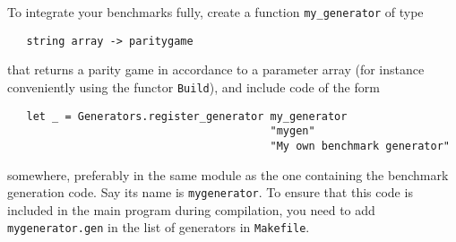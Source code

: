 To integrate your benchmarks fully, create a function \verb#my_generator# of type 
\begin{verbatim}
   string array -> paritygame
\end{verbatim}
that returns a parity game in accordance to a parameter array (for instance conveniently using the functor \verb#Build#), and include
code of the form
\begin{verbatim}
   let _ = Generators.register_generator my_generator 
                                         "mygen" 
                                         "My own benchmark generator"
\end{verbatim}
somewhere, preferably in the same module as the one containing the benchmark generation code. Say its name is \verb#mygenerator#.
To ensure that this code is included in the main program during compilation, you need to add \verb#mygenerator.gen# in the
list of generators in \verb#Makefile#.




